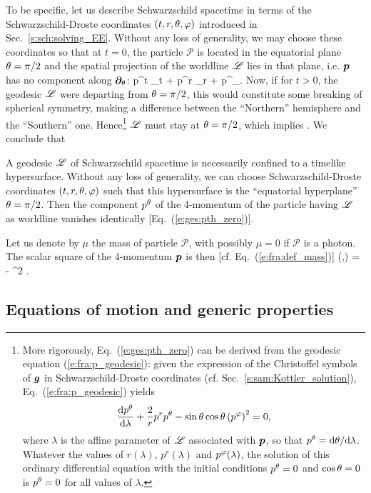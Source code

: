 To be specific, let us describe Schwarzschild spacetime in terms of the
Schwarzschild-Droste coordinates $(t,r,\theta,\varphi)$ introduced in Sec.~\ref{s:sch:solving_EE}.
Without any loss of generality, we may choose these coordinates so that
at $t=0$, the particle $\mathscr{P}$ is located in the equatorial plane $\theta=\pi/2$ and
the spatial projection of the worldline $\mathscr{L}$ lies in that plane, i.e. $\bm{p}$ has
no component along $\bm{\partial}_\theta$:
\be
      p^t \wpar_{t} + p^r \wpar_r + p^\ph \wpar_\ph .
\ee
Now, if for $t>0$, the geodesic $\mathscr{L}$ were departing from $\theta=\pi/2$, this
would constitute some breaking of spherical symmetry, making a difference
between the ``Northern'' hemisphere and the ``Southern'' one.
Hence\footnote{More rigorously, Eq.~(\ref{e:ges:pth_zero}) can
be derived from the geodesic equation (\ref{e:fra:p_geodesic}): given
the expression of the Christoffel symbols of $\bm{g}$ in Schwarzschild-Droste
coordinates (cf. Sec.~\ref{s:sam:Kottler_solution}), Eq.~(\ref{e:fra:p_geodesic})
yields \[\frac{\mathrm{d} p^\theta}{\mathrm{d}\lambda} +\frac{2}{r}  p^r p^\theta - \sin\theta\cos\theta \left( p^\varphi \right)^2 = 0,\] where $\lambda$ is the affine parameter of $\mathscr{L}$ associated with $\bm{p}$,
so that $p^\theta=\mathrm{d}\theta/\mathrm{d}\lambda$. Whatever the values of $r(\lambda)$,
$p^r(\lambda)$ and $p^\varphi(\lambda)$,
the solution of this ordinary differential equation with the initial conditions $p^\theta=0$ and
$\cos\theta=0$ is $p^\theta=0$ for all values of $\lambda$.} $\mathscr{L}$
must stay at $\theta=\pi/2$, which implies
\be \label{e:ges:pth_zero}
     .
\ee
We conclude that
\begin{greybox}
A geodesic $\mathscr{L}$ of Schwarzschild spacetime is necessarily confined to a timelike hypersurface.
Without any loss of generality, we can choose Schwarzschild-Droste coordinates $(t,r,\theta,\varphi)$
such that this hypersurface is the ``equatorial hyperplane'' $\theta=\pi/2$.
Then the component $p^\theta$ of the 4-momentum of the particle having $\mathscr{L}$ as worldline
vanishes identically [Eq.~(\ref{e:ges:pth_zero})].
\end{greybox}

Let us denote by $\mu$ the mass of particle $\mathscr{P}$, with possibly
$\mu=0$ if $\mathscr{P}$ is a photon. The scalar square of the 4-momentum $\bm{p}$ is
then [cf. Eq.~(\ref{e:fra:def_mass})]
\be \label{e:ges:p2_mu2}
    (,) = - \mu^2 .
\ee

\subsection{Equations of motion and generic properties} \label{s:ges:eq_to_be_solved}

